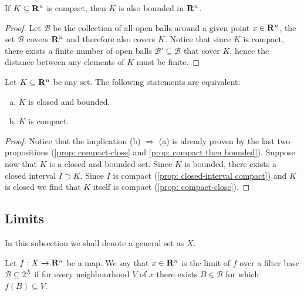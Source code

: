 \begin{proposition}\label{prop: compact then bounded}
    If \(K \subseteq \mathbf{R}^n\) is compact, then \(K\) is also bounded in \(\mathbf{R}^n\).
\end{proposition}

\begin{proof}
    Let \(\mathcal B\) be the collection of all open balls around a given point
    \(x \in \mathbf{R}^n\), the set \(\mathcal B\) covers \(\mathbf{R}^n\) and therefore also
    covers \(K\). Notice that since \(K\) is compact, there exists a finite number
    of open balls \(\mathcal B' \subseteq \mathcal B\) that cover \(K\), hence the
    distance between any elements of \(K\) must be finite.
\end{proof}

\begin{theorem}\label{heine-borel}
    Let \(K \subseteq \mathbf{R}^n\) be any set. The following statements are equivalent:
    \begin{enumerate}[(a)]
        \item \(K\) is closed and bounded.
        \item \(K\) is compact.
    \end{enumerate}
\end{theorem}

\begin{proof}
    Notice that the implication (b) \(\Rightarrow\) (a) is already proven by the
    last two propositions (\cref{prop: compact-close} and \cref{prop: compact then
        bounded}). Suppose now that \(K\) is a closed and bounded set. Since \(K\) is
    bounded, there exists a closed interval \(I \supset K\). Since \(I\) is
    compact (\cref{prop: closed-interval compact}) and \(K\) is closed we find
    that \(K\) itself is compact (\cref{prop: compact-close}).
\end{proof}

\subsection{Limits}

\begin{remark}
    In this subsection we shall denote a general set as \(X\).
\end{remark}

\begin{definition}[Limit]\label{def: limit-several}
    Let \(f: X \to \mathbf{R}^n\) be a map. We say that \(x \in \mathbf{R}^n\) is the limit of
    \(f\) over a filter base \(\mathcal B \subseteq  2^X\) if for every
    neighbourhood \(V\) of \(x\) there exists \(B \in \mathcal B\) for which
    \(f(B) \subseteq V\).
\end{definition}

